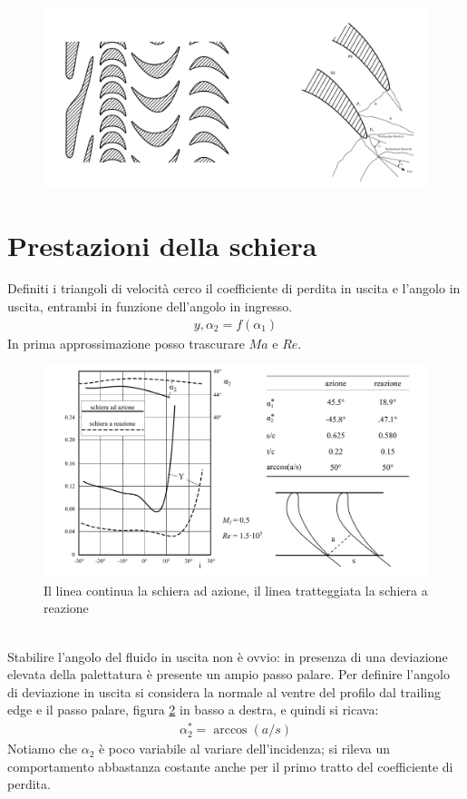 \begin{figure}
\centering
  \includegraphics[width=\textwidth]{fig/PaleSup.pdf}
\caption{}
\label{fig:PaleSup}
\end{figure}

\section{Prestazioni della schiera}
Definiti i triangoli di velocità cerco il coefficiente di perdita in uscita e l'angolo in uscita, entrambi in funzione dell'angolo in ingresso.
\begin{align*}
y, \alpha_2 = f \left( \alpha_1 \right)
\end{align*}
In prima approssimazione posso trascurare $Ma$ e $Re$.
\begin{figure}
\centering
  \includegraphics[width=\textwidth]{fig/PrestSchieraTurb.pdf}
\caption{Il linea continua la schiera ad azione, il linea tratteggiata la schiera a reazione}
\label{fig:PrestSchieraTurb}
\end{figure}
\\Stabilire l'angolo del fluido in uscita non è ovvio: in presenza di una deviazione elevata della palettatura è presente un ampio passo palare. Per definire l'angolo di deviazione in uscita si considera la normale al ventre del profilo dal trailing edge e il passo palare, figura \ref{fig:PrestSchieraTurb} in basso a destra, e quindi si ricava:
\begin{align*}
\alpha_2^* = \arccos (a/s)
\end{align*}
Notiamo che $\alpha_2$ è poco variabile al variare dell'incidenza; si rileva un comportamento abbastanza costante anche per il primo tratto del coefficiente di perdita.

